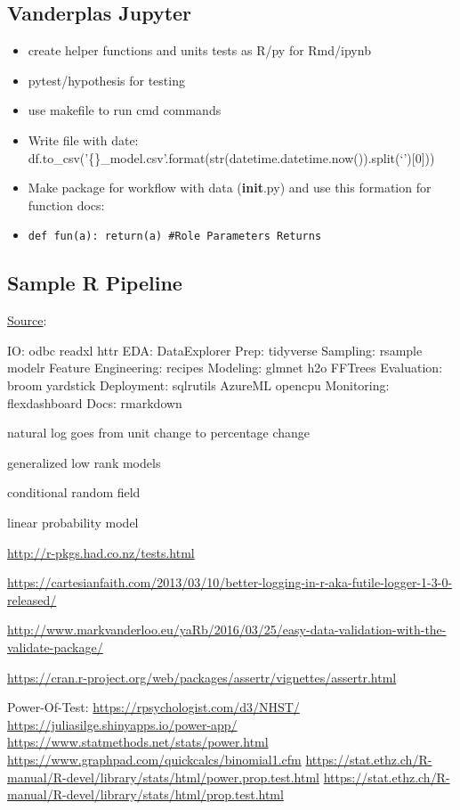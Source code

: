 \documentclass[]{book}
\begin{document}
\subsection{Vanderplas Jupyter}\label{vanderplas-jupyter}

\begin{itemize}
\item
  create helper functions and units tests as R/py for Rmd/ipynb
\item
  pytest/hypothesis for testing
\item
  use makefile to run cmd commands
\item
  Write file with date:
  df.to\_csv('\{\}\_model.csv'.format(str(datetime.datetime.now()).split(`'){[}0{]}))
\item
  Make package for workflow with data (\textbf{init}.py) and use this
  formation for function docs:
\item
  \texttt{def\ fun(a):\ return(a)\ \#Role\ Parameters\ Returns}
\end{itemize}

\subsection{Sample R Pipeline}\label{sample-r-pipeline}

\href{https://mobile.twitter.com/TheStephLocke/status/990251709531344896}{Source}:

IO: odbc readxl httr EDA: DataExplorer Prep: tidyverse Sampling: rsample
modelr Feature Engineering: recipes Modeling: glmnet h2o FFTrees
Evaluation: broom yardstick Deployment: sqlrutils AzureML opencpu
Monitoring: flexdashboard Docs: rmarkdown

natural log goes from unit change to percentage change

generalized low rank models

conditional random field

linear probability model

\url{http://r-pkgs.had.co.nz/tests.html}

\url{https://cartesianfaith.com/2013/03/10/better-logging-in-r-aka-futile-logger-1-3-0-released/}

\url{http://www.markvanderloo.eu/yaRb/2016/03/25/easy-data-validation-with-the-validate-package/}

\url{https://cran.r-project.org/web/packages/assertr/vignettes/assertr.html}

Power-Of-Test: \url{https://rpsychologist.com/d3/NHST/}
\url{https://juliasilge.shinyapps.io/power-app/}
\url{https://www.statmethods.net/stats/power.html}
\url{https://www.graphpad.com/quickcalcs/binomial1.cfm}
\url{https://stat.ethz.ch/R-manual/R-devel/library/stats/html/power.prop.test.html}
\url{https://stat.ethz.ch/R-manual/R-devel/library/stats/html/prop.test.html}
\end{document}
